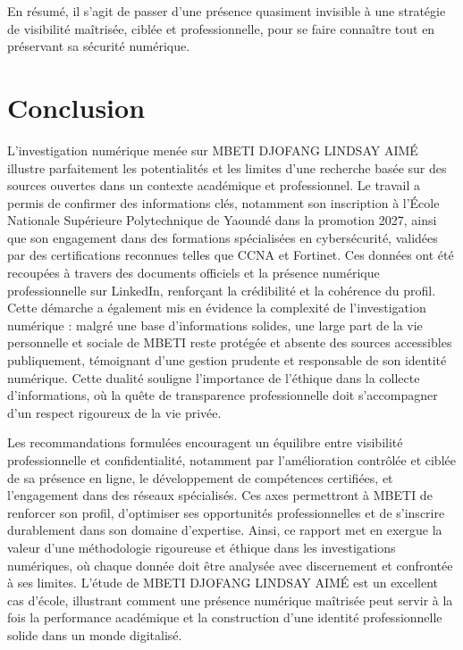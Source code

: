 \documentclass[12pt, a4paper]{article}
\begin{document}
	En résumé, il s'agit de passer d'une présence quasiment invisible à une stratégie de visibilité maîtrisée, ciblée et professionnelle, pour se faire connaître tout en préservant sa sécurité numérique.
	
	\newpage
	
	\section{\textbf{Conclusion}\label{conclusion}}
	
	L'investigation numérique menée sur MBETI DJOFANG LINDSAY AIMÉ illustre parfaitement les potentialités et les limites d'une recherche basée sur des sources ouvertes dans un contexte académique et professionnel. Le travail a permis de confirmer des informations clés, notamment son inscription à l'École Nationale Supérieure Polytechnique de Yaoundé dans la promotion 2027, ainsi que son engagement dans des formations spécialisées en cybersécurité, validées par des certifications reconnues telles que CCNA et Fortinet. Ces données ont été recoupées à travers des documents officiels et la présence numérique professionnelle sur LinkedIn, renforçant la crédibilité et la cohérence du profil. Cette démarche a également mis en évidence la complexité de l'investigation numérique : malgré une base d'informations solides, une large part de la vie personnelle et sociale de MBETI reste protégée et absente des sources accessibles publiquement, témoignant d'une gestion prudente et responsable de son identité numérique. Cette dualité souligne l'importance de l'éthique dans la collecte d'informations, où la quête de transparence professionnelle doit s'accompagner d'un respect rigoureux de la vie privée.
	
	Les recommandations formulées encouragent un équilibre entre visibilité professionnelle et confidentialité, notamment par l'amélioration contrôlée et ciblée de sa présence en ligne, le développement de compétences certifiées, et l'engagement dans des réseaux spécialisés. Ces axes permettront à MBETI de renforcer son profil, d'optimiser ses opportunités professionnelles et de s'inscrire durablement dans son domaine d'expertise. Ainsi, ce rapport met en exergue la valeur d'une méthodologie rigoureuse et éthique dans les investigations numériques, où chaque donnée doit être analysée avec discernement et confrontée à ses limites. L'étude de MBETI DJOFANG LINDSAY AIMÉ est un excellent cas d'école, illustrant comment une présence numérique maîtrisée peut servir à la fois la performance académique et la construction d'une identité professionnelle solide dans un monde digitalisé.
	
	
\end{document}
